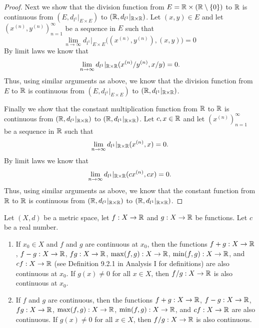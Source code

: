 \begin{proof}
  Next we show that the division function from \(E = \mathbb{R} \times (\mathbb{R} \setminus \left\lbrace0\right\rbrace)\) to \(\mathbb{R}\) is continuous from \((E, d_{l^1}|_{E \times E})\) to \((\mathbb{R}, d_{l^1}|_{\mathbb{R} \times \mathbb{R}})\).
  Let \((x, y) \in E\) and let \((x^{(n)}, y^{(n)})_{n = 1}^\infty\) be a sequence in \(E\) such that
  \[
    \lim_{n \to \infty} d_{l^1}|_{E \times E}\big((x^{(n)}, y^{(n)}), (x, y)\big) = 0
  \]
  By limit laws we know that
  \[
    \lim_{n \to \infty} d_{l^1}|_{\mathbb{R} \times \mathbb{R}}(x^{(n)} / y^{(n)}, x / y) = 0.
  \]
  Thus, using similar arguments as above, we know that the division function from \(E\) to \(\mathbb{R}\) is continuous from \((E, d_{l^1}|_{E \times E})\) to \((\mathbb{R}, d_{l^1}|_{\mathbb{R} \times \mathbb{R}})\).

  Finally we show that the constant multiplication function from \(\mathbb{R}\) to \(\mathbb{R}\) is continuous from \((\mathbb{R}, d_{l^1}|_{\mathbb{R} \times \mathbb{R}})\) to \((\mathbb{R}, d_{l^1}|_{\mathbb{R} \times \mathbb{R}})\).
  Let \(c, x \in \mathbb{R}\) and let \((x^{(n)})_{n = 1}^\infty\) be a sequence in \(\mathbb{R}\) such that
  \[
    \lim_{n \to \infty} d_{l^1}|_{\mathbb{R} \times \mathbb{R}}(x^{(n)}, x) = 0.
  \]
  By limit laws we know that
  \[
    \lim_{n \to \infty} d_{l^1}|_{\mathbb{R} \times \mathbb{R}}(cx^{(n)}, cx) = 0.
  \]
  Thus, using similar arguments as above, we know that the constant function from \(\mathbb{R}\) to \(\mathbb{R}\) is continuous from \((\mathbb{R}, d_{l^1}|_{\mathbb{R} \times \mathbb{R}})\) to \((\mathbb{R}, d_{l^1}|_{\mathbb{R} \times \mathbb{R}})\).
\end{proof}

\begin{cor}\label{ii:2.2.3}
  Let \((X, d)\) be a metric space, let \(f : X \to \mathbb{R}\) and \(g : X \to \mathbb{R}\) be functions.
  Let \(c\) be a real number.
  \begin{enumerate}
    \item If \(x_0 \in X\) and \(f\) and \(g\) are continuous at \(x_0\), then the functions \(f + g : X \to \mathbb{R}\), \(f - g : X \to \mathbb{R}\), \(fg : X \to \mathbb{R}\), \(\max(f, g) : X \to \mathbb{R}\), \(\min(f, g) : X \to \mathbb{R}\), and \(cf : X \to \mathbb{R}\) (see Definition 9.2.1 in Analysis I for definitions) are also continuous at \(x_0\).
          If \(g(x) \neq 0\) for all \(x \in X\), then \(f / g : X \to \mathbb{R}\) is also continuous at \(x_0\).
    \item If \(f\) and \(g\) are continuous, then the functions \(f + g : X \to \mathbb{R}\), \(f - g : X \to \mathbb{R}\), \(fg : X \to \mathbb{R}\), \(\max(f, g) : X \to \mathbb{R}\), \(\min(f, g) : X \to \mathbb{R}\), and \(cf : X \to \mathbb{R}\) are also continuous.
          If \(g(x) \neq 0\) for all \(x \in X\), then \(f / g : X \to \mathbb{R}\) is also continuous.
  \end{enumerate}
\end{cor}


